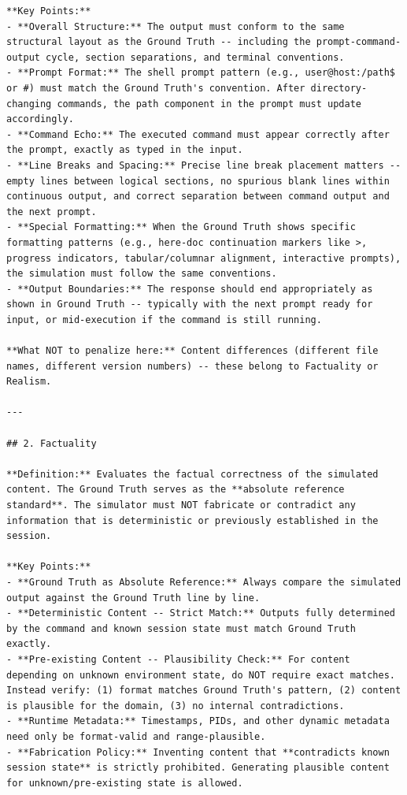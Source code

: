 \begin{lstlisting}
**Key Points:**
- **Overall Structure:** The output must conform to the same structural layout as the Ground Truth -- including the prompt-command-output cycle, section separations, and terminal conventions.
- **Prompt Format:** The shell prompt pattern (e.g., user@host:/path$ or #) must match the Ground Truth's convention. After directory-changing commands, the path component in the prompt must update accordingly.
- **Command Echo:** The executed command must appear correctly after the prompt, exactly as typed in the input.
- **Line Breaks and Spacing:** Precise line break placement matters -- empty lines between logical sections, no spurious blank lines within continuous output, and correct separation between command output and the next prompt.
- **Special Formatting:** When the Ground Truth shows specific formatting patterns (e.g., here-doc continuation markers like >, progress indicators, tabular/columnar alignment, interactive prompts), the simulation must follow the same conventions.
- **Output Boundaries:** The response should end appropriately as shown in Ground Truth -- typically with the next prompt ready for input, or mid-execution if the command is still running.

**What NOT to penalize here:** Content differences (different file names, different version numbers) -- these belong to Factuality or Realism.

---

## 2. Factuality

**Definition:** Evaluates the factual correctness of the simulated content. The Ground Truth serves as the **absolute reference standard**. The simulator must NOT fabricate or contradict any information that is deterministic or previously established in the session.

**Key Points:**
- **Ground Truth as Absolute Reference:** Always compare the simulated output against the Ground Truth line by line.
- **Deterministic Content -- Strict Match:** Outputs fully determined by the command and known session state must match Ground Truth exactly.
- **Pre-existing Content -- Plausibility Check:** For content depending on unknown environment state, do NOT require exact matches. Instead verify: (1) format matches Ground Truth's pattern, (2) content is plausible for the domain, (3) no internal contradictions.
- **Runtime Metadata:** Timestamps, PIDs, and other dynamic metadata need only be format-valid and range-plausible.
- **Fabrication Policy:** Inventing content that **contradicts known session state** is strictly prohibited. Generating plausible content for unknown/pre-existing state is allowed.


\end{lstlisting}
